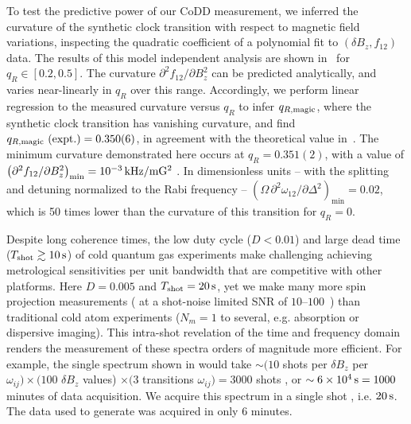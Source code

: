 \documentclass[aps,prl,reprint,superscriptaddress,floatfix]{revtex4-1}
\begin{document}
To test the predictive power of our CoDD measurement, we inferred the curvature of the synthetic clock transition with respect to magnetic field variations, inspecting the quadratic coefficient of a polynomial fit to $(\delta B_z, f_{12})$ data.
The results of this model independent analysis are shown in~ for $q_R \in [0.2, 0.5]$.
The curvature $\partial^2 f_{12}/\partial B_z^2$ can be predicted analytically, and varies near-linearly in $q_R$ over this range.
Accordingly, we perform linear regression to the measured curvature versus $q_R$ to infer $q_{R,\text{magic}}$, where the synthetic clock transition has vanishing curvature, and find $q_{R,\text{magic}}\text{ (expt.)} = 0.350(6)$, in agreement with the theoretical value in~.
The minimum curvature demonstrated here occurs at $q_R = 0.351(2)$, with a value of $\left(\partial^2 f_{12}/\partial B_z^2\right)_{\text{min}} = \unit[10^{-3}]{kHz/mG^2}$ .
In dimensionless units -- with the splitting and detuning normalized to the Rabi frequency -- $\left(\Omega\, \partial^2\omega_{12}/\partial \Delta^2\right)_{\text{min}} = 0.02$, which is 50 times lower than the curvature of this transition for $q_R = 0$.

Despite long coherence times, the low duty cycle ($D < 0.01$) and large dead time ($T_\text{shot} \gtrsim \unit[10]{s}$) of cold quantum gas experiments make challenging achieving metrological sensitivities per unit bandwidth that are competitive with other platforms.
Here $D=0.005$ and $T_\text{shot} = \unit[20]{s}$, yet we make many more spin projection measurements ( at a shot-noise limited SNR of $10$--$100$~\cite{jasperse_magic-wavelength_2017}) than traditional cold atom experiments ($N_m = 1$ to several, e.g. absorption or dispersive imaging).
This intra-shot revelation of the time and frequency domain renders the measurement of these spectra orders of magnitude more efficient.
For example, the single spectrum shown in  would take $\sim (10$ shots per $\delta B_z$ per $\omega_{ij} ) \times (100$ $\delta B_z$ values) $\times (3 $ transitions $\omega_{ij}) = 3000$ shots , or $\sim \unit[6\times10^4]{s} = 1000$ minutes of data acquisition.
We acquire this spectrum in a single shot , i.e. $\unit[20]{s}$.
The data used to generate  was acquired in only $6$ minutes.
\end{document}
